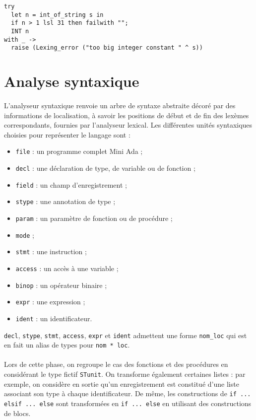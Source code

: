\documentclass[a4paper,12pt]{article}
\begin{document}
\begin{lstlisting}
try
  let n = int_of_string s in
  if n > 1 lsl 31 then failwith "";
  INT n
with _ -> 
  raise (Lexing_error ("too big integer constant " ^ s))
\end{lstlisting}

\section{Analyse syntaxique}

\paragraph*{}
L'analyseur syntaxique renvoie un arbre de syntaxe abstraite décoré par des informations de localisation, à savoir les positions de début et de fin des lexèmes correspondants, fournies par l'analyseur lexical. Les différentes unités syntaxiques choisies pour représenter le langage sont :

\begin{itemize}
\item \texttt{file} : un programme complet Mini Ada ;
\item \texttt{decl} : une déclaration de type, de variable ou de fonction ;
\item \texttt{field} : un champ d'enregistrement ;
\item \texttt{stype} : une annotation de type ;
\item \texttt{param} : un paramètre de fonction ou de procédure ;
\item \texttt{mode} ;
\item \texttt{stmt} : une instruction ;
\item \texttt{access} : un accès à une variable ;
\item \texttt{binop} : un opérateur binaire ;
\item \texttt{expr} : une expression ;
\item \texttt{ident} : un identificateur.
\end{itemize}

\texttt{decl}, \texttt{stype}, \texttt{stmt}, \texttt{access}, \texttt{expr} et \texttt{ident} admettent une forme \texttt{nom\_loc} qui est en fait un alias de types pour \texttt{nom * loc}.

\paragraph*{}
Lors de cette phase, on regroupe le cas des fonctions et des procédures en considérant le type fictif \texttt{STunit}. On transforme également certaines listes : par exemple, on considère en sortie qu'un enregistrement est constitué d'une liste associant son type à chaque identificateur. De même, les constructions de \texttt{if ... elsif ... else} sont transformées en \texttt{if ... else} en utilisant des constructions de blocs.
\end{document}
